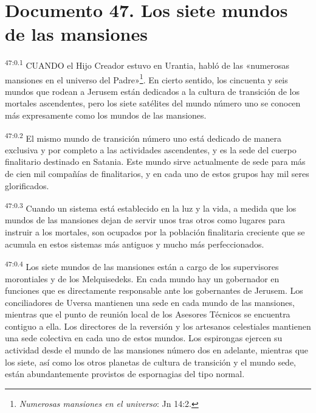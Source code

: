 \chapter{Documento 47. Los siete mundos de las mansiones}
\par
\textsuperscript{47:0.1} CUANDO el Hijo Creador estuvo en Urantia, habló de las «numerosas mansiones en el universo del Padre»\footnote{\textit{Numerosas mansiones en el universo}: Jn 14:2.}. En cierto sentido, los cincuenta y seis mundos que rodean a Jerusem están dedicados a la cultura de transición de los mortales ascendentes, pero los siete satélites del mundo número uno se conocen más expresamente como los mundos de las mansiones.

\par
\textsuperscript{47:0.2} El mismo mundo de transición número uno está dedicado de manera exclusiva y por completo a las actividades ascendentes, y es la sede del cuerpo finalitario destinado en Satania. Este mundo sirve actualmente de sede para más de cien mil compañías de finalitarios, y en cada uno de estos grupos hay mil seres glorificados.

\par
\textsuperscript{47:0.3} Cuando un sistema está establecido en la luz y la vida, a medida que los mundos de las mansiones dejan de servir unos tras otros como lugares para instruir a los mortales, son ocupados por la población finalitaria creciente que se acumula en estos sistemas más antiguos y mucho más perfeccionados.

\par
\textsuperscript{47:0.4} Los siete mundos de las mansiones están a cargo de los supervisores morontiales y de los Melquisedeks. En cada mundo hay un gobernador en funciones que es directamente responsable ante los gobernantes de Jerusem. Los conciliadores de Uversa mantienen una sede en cada mundo de las mansiones, mientras que el punto de reunión local de los Asesores Técnicos se encuentra contiguo a ella. Los directores de la reversión y los artesanos celestiales mantienen una sede colectiva en cada uno de estos mundos. Los espirongas ejercen su actividad desde el mundo de las mansiones número dos en adelante, mientras que los siete, así como los otros planetas de cultura de transición y el mundo sede, están abundantemente provistos de espornagias del tipo normal.

